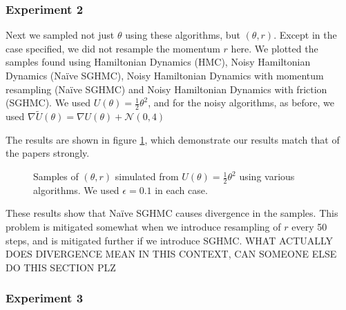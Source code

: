 \subsubsection*{Experiment 2}

Next we sampled not just $\theta$ using these algorithms, but $(\theta, r)$. Except in the case specified, we did not resample the momentum $r$ here. We plotted the samples found using Hamiltonian Dynamics (HMC), Noisy Hamiltonian Dynamics (Naïve SGHMC), Noisy Hamiltonian Dynamics with momentum resampling (Naïve SGHMC) and Noisy Hamiltonian Dynamics with friction (SGHMC). We used $U(\theta) = \frac{1}{2}\theta^2$, and for the noisy algorithms, as before, we used 
$\nabla \widetilde{U}(\theta) = \nabla U(\theta) + \mathcal{N}(0,4)$

The results are shown in figure \ref{theta_r_samples}, which demonstrate our results match that of the papers strongly. 

\begin{figure}[h!] 
    \centering
    \hfill%
    \caption{Samples of $(\theta,r)$ simulated from $U(\theta) = \frac{1}{2}\theta^2$ using various algorithms. We used $\epsilon=0.1$ in each case.}
    \label{theta_r_samples}
\end{figure}

These results show that Naïve SGHMC causes divergence in the samples. This problem is mitigated somewhat when we introduce resampling of $r$ every 50 steps, and is mitigated further if we introduce SGHMC. WHAT ACTUALLY DOES DIVERGENCE MEAN IN THIS CONTEXT, CAN SOMEONE ELSE DO THIS SECTION PLZ

\subsubsection*{Experiment 3}

